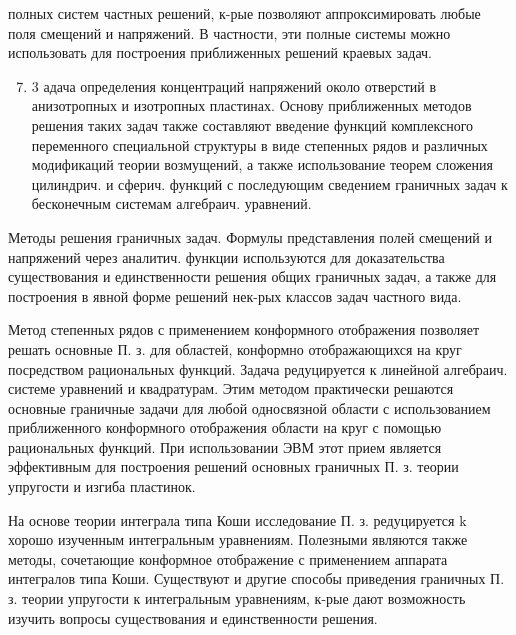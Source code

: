 \documentclass[10pt]{article}
\begin{document}
полных систем частных решений, к-рые позволяют аппроксимировать любые поля смещений и напряжений. В частности, эти полные системы можно использовать для построения приближенных решений краевых задач.



\begin{enumerate}

  \setcounter{enumi}{6}

  \item 3 адача определения концентраций напряжений около отверстий в анизотропных и изотропных пластинах. Основу приближенных методов решения таких задач также составляют введение функций комплексного переменного специальной структуры в виде степенных рядов и различных модификаций теории возмущений, а также использование теорем сложения цилиндрич. и сферич. функций с последующим сведением граничных задач к бесконечным системам алгебраич. уравнений.

\end{enumerate}



Методы решения граничных задач. Формулы представления полей смещений и напряжений через аналитич. функции используются для доказательства существования и единственности решения общих граничных задач, а также для построения в явной форме решений нек-рых классов задач частного вида.



Метод степенных рядов с применением конформного отображения позволяет решать основные П. з. для областей, конформно отображающихся на круг посредством рациональных функций. Задача редуцируется к линейной алгебраич. системе уравнений и квадратурам. Этим методом практически решаются основные граничные задачи для любой односвязной области с использованием приближенного конформного отображения области на круг с помощью рациональных функций. При использовании ЭВМ этот прием является эффективным для построения решений основных граничных П. з. теории упругости и изгиба пластинок.



На основе теории интеграла типа Коши исследование П. з. редуцируется $\mathrm{k}$ хорошо изученным интегральным уравнениям. Полезными являются также методы, сочетающие конформное отображение с применением аппарата интегралов типа Коши. Существуют и другие способы приведения граничных П. з. теории упругости к интегральным уравнениям, к-рые дают возможность изучить вопросы существования и единственности решения.
\end{document}
